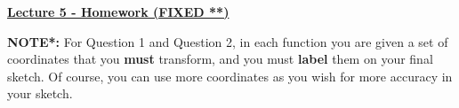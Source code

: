 \documentclass[12pt]{article} %
\begin{document}
	\renewcommand*{\coursecode}{MATH 235} %
	\renewcommand*{\assgnnumber}{Assignment 1} %
	\renewcommand*{\submdate}{September 14, 2021} %
	\renewcommand*{\studentfname}{Abdullah} %
	\renewcommand*{\studentlname}{Zubair} %
    \renewcommand*{\proofname}{Proof:}

	\renewcommand\qedsymbol{$\blacksquare$}
	\setfigpath
	\fancyhfoffset[L,O]{0pt} %




\begin{center}
	\textbf{\underline{\Huge{Lecture 5 - Homework (FIXED **)}}}
\end{center}

\textbf{NOTE*:} For Question 1 and Question 2, in each function you are given a set of coordinates that you \textbf{must}
  transform, and you must \textbf{label} them on your final sketch. Of course, you can use more coordinates as you wish for 
  more accuracy in your sketch.
\end{document}
